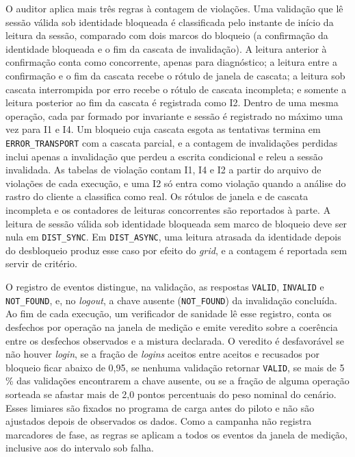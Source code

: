 O auditor aplica mais três regras à contagem de violações. Uma validação que lê sessão válida sob identidade bloqueada é classificada pelo instante de início da leitura da sessão, comparado com dois marcos do bloqueio (a confirmação da identidade bloqueada e o fim da cascata de invalidação). A leitura anterior à confirmação conta como concorrente, apenas para diagnóstico; a leitura entre a confirmação e o fim da cascata recebe o rótulo de janela de cascata; a leitura sob cascata interrompida por erro recebe o rótulo de cascata incompleta; e somente a leitura posterior ao fim da cascata é registrada como I2. Dentro de uma mesma operação, cada par formado por invariante e sessão é registrado no máximo uma vez para I1 e I4. Um bloqueio cuja cascata esgota as tentativas termina em \texttt{ERROR\_TRANSPORT} com a cascata parcial, e a contagem de invalidações perdidas inclui apenas a invalidação que perdeu a escrita condicional e releu a sessão invalidada. As tabelas de violação contam I1, I4 e I2 a partir do arquivo de violações de cada execução, e uma I2 só entra como violação quando a análise do rastro do cliente a classifica como real. Os rótulos de janela e de cascata incompleta e os contadores de leituras concorrentes são reportados à parte. A leitura de sessão válida sob identidade bloqueada sem marco de bloqueio deve ser nula em \texttt{DIST\_SYNC}. Em \texttt{DIST\_ASYNC}, uma leitura atrasada da identidade depois do desbloqueio produz esse caso por efeito do \emph{grid}, e a contagem é reportada sem servir de critério.

O registro de eventos distingue, na validação, as respostas \texttt{VALID}, \texttt{INVALID} e \texttt{NOT\_FOUND}, e, no \emph{logout}, a chave ausente (\texttt{NOT\_FOUND}) da invalidação concluída. Ao fim de cada execução, um verificador de sanidade lê esse registro, conta os desfechos por operação na janela de medição e emite veredito sobre a coerência entre os desfechos observados e a mistura declarada. O veredito é desfavorável se não houver \emph{login}, se a fração de \emph{logins} aceitos entre aceitos e recusados por bloqueio ficar abaixo de 0,95, se nenhuma validação retornar \texttt{VALID}, se mais de 5\,\% das validações encontrarem a chave ausente, ou se a fração de alguma operação sorteada se afastar mais de 2,0 pontos percentuais do peso nominal do cenário. Esses limiares são fixados no programa de carga antes do piloto e não são ajustados depois de observados os dados. Como a campanha não registra marcadores de fase, as regras se aplicam a todos os eventos da janela de medição, inclusive aos do intervalo sob falha.

